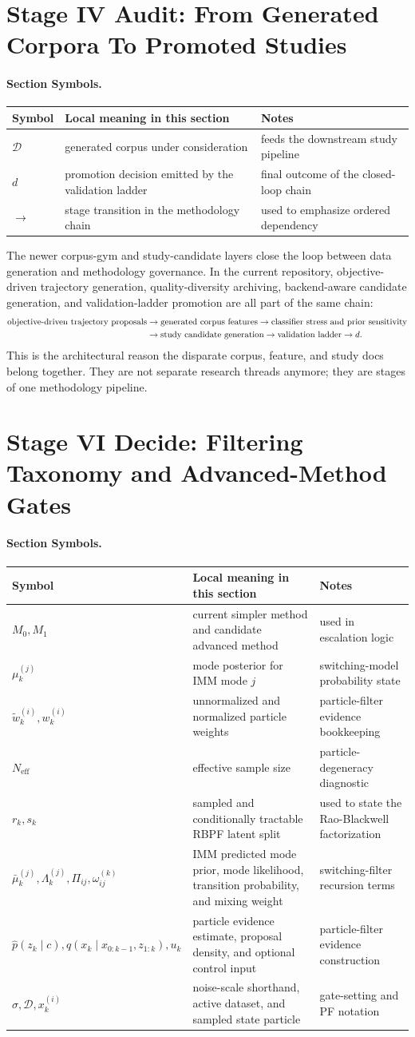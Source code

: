 \documentclass[11pt]{article}
\newcommand{\sectionsymbol}[3]{#1 & #2 & #3 \\}
\newcommand{\sectionsymbols}[1]{%
\begin{center}
\small
\setlength{\tabcolsep}{4pt}
\begin{tabularx}{0.95\textwidth}{>{\raggedright\arraybackslash}p{0.16\textwidth}X>{\raggedright\arraybackslash}p{0.18\textwidth}}
\toprule
Symbol & Local meaning in this section & Notes \\
\midrule
#1
\bottomrule
\end{tabularx}
\end{center}
}
\begin{document}
\section{Stage IV Audit: From Generated Corpora To Promoted Studies}
\paragraph{Section Symbols.}
\sectionsymbols{
\sectionsymbol{\(\mathcal{D}\)}{generated corpus under consideration}{feeds the downstream study pipeline}
\sectionsymbol{\(d\)}{promotion decision emitted by the validation ladder}{final outcome of the closed-loop chain}
\sectionsymbol{\(\rightarrow\)}{stage transition in the methodology chain}{used to emphasize ordered dependency}
}

\noindent
The newer corpus-gym and study-candidate layers close the loop between data generation and methodology governance. In the current repository, objective-driven trajectory generation, quality-diversity archiving, backend-aware candidate generation, and validation-ladder promotion are all part of the same chain:
\begin{align}
\text{objective-driven trajectory proposals}
&\rightarrow
\text{generated corpus features}
\rightarrow
\text{classifier stress and prior sensitivity}
\notag \\
&\rightarrow
\text{study candidate generation}
\rightarrow
\text{validation ladder}
\rightarrow
d.
\end{align}
This is the architectural reason the disparate corpus, feature, and study docs belong together. They are not separate research threads anymore; they are stages of one methodology pipeline.

\section{Stage VI Decide: Filtering Taxonomy and Advanced-Method Gates}
\paragraph{Section Symbols.}
\sectionsymbols{
\sectionsymbol{\(M_0, M_1\)}{current simpler method and candidate advanced method}{used in escalation logic}
\sectionsymbol{\(\mu_k^{(j)}\)}{mode posterior for IMM mode \(j\)}{switching-model probability state}
\sectionsymbol{\(\tilde{w}_k^{(i)}, w_k^{(i)}\)}{unnormalized and normalized particle weights}{particle-filter evidence bookkeeping}
\sectionsymbol{\(N_{\mathrm{eff}}\)}{effective sample size}{particle-degeneracy diagnostic}
\sectionsymbol{\(r_k, s_k\)}{sampled and conditionally tractable RBPF latent split}{used to state the Rao-Blackwell factorization}
\sectionsymbol{\(\bar{\mu}_k^{(j)}, \Lambda_k^{(j)}, \Pi_{ij}, \omega_{ij}^{(k)}\)}{IMM predicted mode prior, mode likelihood, transition probability, and mixing weight}{switching-filter recursion terms}
\sectionsymbol{\(\hat{p}(z_k \mid c), q(x_k \mid x_{0:k-1}, z_{1:k}), u_k\)}{particle evidence estimate, proposal density, and optional control input}{particle-filter evidence construction}
\sectionsymbol{\(\sigma, \mathcal{D}, x_k^{(i)}\)}{noise-scale shorthand, active dataset, and sampled state particle}{gate-setting and PF notation}
}
\end{document}
